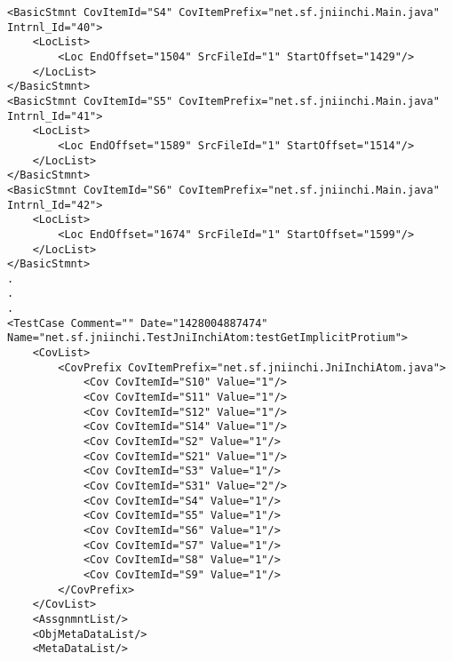 \begin{lstlisting}
<BasicStmnt CovItemId="S4" CovItemPrefix="net.sf.jniinchi.Main.java" Intrnl_Id="40">
	<LocList>
		<Loc EndOffset="1504" SrcFileId="1" StartOffset="1429"/>
	</LocList>
</BasicStmnt>
<BasicStmnt CovItemId="S5" CovItemPrefix="net.sf.jniinchi.Main.java" Intrnl_Id="41">
	<LocList>
		<Loc EndOffset="1589" SrcFileId="1" StartOffset="1514"/>
	</LocList>
</BasicStmnt>
<BasicStmnt CovItemId="S6" CovItemPrefix="net.sf.jniinchi.Main.java" Intrnl_Id="42">
	<LocList>
		<Loc EndOffset="1674" SrcFileId="1" StartOffset="1599"/>
	</LocList>
</BasicStmnt>
.
.
.
<TestCase Comment="" Date="1428004887474" Name="net.sf.jniinchi.TestJniInchiAtom:testGetImplicitProtium">
	<CovList>
		<CovPrefix CovItemPrefix="net.sf.jniinchi.JniInchiAtom.java">
			<Cov CovItemId="S10" Value="1"/>
			<Cov CovItemId="S11" Value="1"/>
			<Cov CovItemId="S12" Value="1"/>
			<Cov CovItemId="S14" Value="1"/>
			<Cov CovItemId="S2" Value="1"/>
			<Cov CovItemId="S21" Value="1"/>
			<Cov CovItemId="S3" Value="1"/>
			<Cov CovItemId="S31" Value="2"/>
			<Cov CovItemId="S4" Value="1"/>
			<Cov CovItemId="S5" Value="1"/>
			<Cov CovItemId="S6" Value="1"/>
			<Cov CovItemId="S7" Value="1"/>
			<Cov CovItemId="S8" Value="1"/>
			<Cov CovItemId="S9" Value="1"/>
		</CovPrefix>
	</CovList>
	<AssgnmntList/>
	<ObjMetaDataList/>
	<MetaDataList/>
\end{lstlisting}

